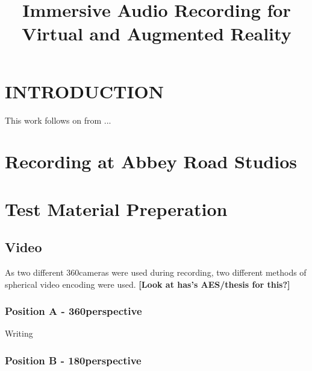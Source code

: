 \documentclass{aes2e}
\begin{document}
\title{Immersive Audio Recording for Virtual and Augmented Reality}



\maketitle

\section{INTRODUCTION}
	This work follows on from \cite{riaz2017multichannel}...

\section{Recording at Abbey Road Studios}

\section{Test Material Preperation} %
	\subsection{Video}
		As two different 360\textdegree cameras were used during recording, two different methods of spherical video encoding were used. \textbf{[Look at has's AES/thesis for this?]}

			\subsubsection{Position A - 360\textdegree perspective}
				Writing

			\subsubsection{Position B - 180\textdegree perspective}
\end{document}
